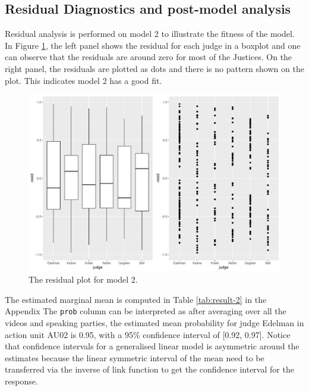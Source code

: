 \documentclass{monashthesis}
\begin{document}
\hypertarget{residual-diagnostics-and-post-model-analysis}{%
\subsection{Residual Diagnostics and post-model analysis}\label{residual-diagnostics-and-post-model-analysis}}

Residual analysis is performed on model 2 to illustrate the fitness of the model. In Figure \ref{fig:resid}, the left panel shows the residual for each judge in a boxplot and one can observe that the residuals are around zero for most of the Justices. On the right panel, the residuals are plotted as dots and there is no pattern shown on the plot. This indicates model 2 has a good fit.

\begin{figure}

{\centering \includegraphics[width=1\linewidth]{figures/resid-1} 

}

\caption{The residual plot for model 2. }\label{fig:resid}
\end{figure}

The estimated marginal mean is computed in Table \ref{tab:result-2} in the Appendix The \texttt{prob} column can be interpreted as after averaging over all the videos and speaking parties, the estimated mean probability for judge Edelman in action unit AU02 is 0.95, with a 95\% confidence interval of {[}0.92, 0.97{]}. Notice that confidence intervals for a generalised linear model is asymmetric around the estimates because the linear symmetric interval of the mean need to be transferred via the inverse of link function to get the confidence interval for the response.
\end{document}

